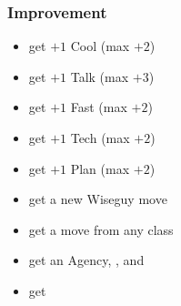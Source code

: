 \subsubsection{Improvement}
\begin{itemize}
\item get $+1$ Cool (max $+2$)
\item get $+1$ Talk (max $+3$)
\item get $+1$ Fast (max $+2$)
\item get $+1$ Tech (max $+2$)
\item get $+1$ Plan (max $+2$)
\item get a new Wiseguy move
\item get a move from any class
\item get an Agency, , and 
\item get 
\end{itemize}